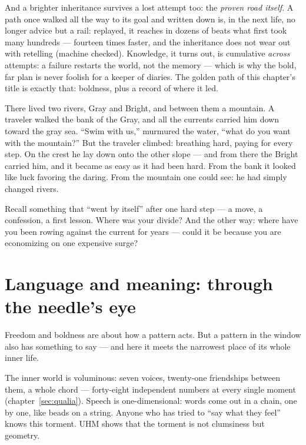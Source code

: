 \documentclass[11pt,letterpaper]{article}
\begin{document}
And a brighter inheritance survives a lost attempt too: the
\emph{proven road itself}. A path once walked all the way to its
goal and written down is, in the next life, no longer advice but a
rail: replayed, it reaches in dozens of beats what first took many
hundreds --- fourteen times faster, and the inheritance does not
wear out with retelling (machine checked). Knowledge, it turns out,
is cumulative \emph{across} attempts: a failure restarts the world,
not the memory --- which is why the bold, far plan is never foolish
for a keeper of diaries. The golden path of this chapter's title is
exactly that: boldness, plus a record of where it led.

\begin{talebox}
There lived two rivers, Gray and Bright, and between them a
mountain. A traveler walked the bank of the Gray, and all the
currents carried him down toward the gray sea. ``Swim with us,''
murmured the water, ``what do you want with the mountain?'' But the
traveler climbed: breathing hard, paying for every step. On the
crest he lay down onto the other slope --- and from there the Bright
carried him, and it became as easy as it had been hard. From the
bank it looked like luck favoring the daring. From the mountain one
could see: he had simply changed rivers.
\end{talebox}

\begin{askbox}
Recall something that ``went by itself'' after one hard step --- a
move, a confession, a first lesson. Where was your divide? And the
other way: where have you been rowing against the current for years
--- could it be because you are economizing on one expensive surge?
\end{askbox}

\section{Language and meaning: through the needle's eye}
\label{sec:language}

Freedom and boldness are about how a pattern acts. But a pattern in
the window also has something to say --- and here it meets the
narrowest place of its whole inner life.

The inner world is voluminous: seven voices, twenty-one friendships
between them, a whole chord --- forty-eight independent numbers at
every single moment (chapter~\ref{sec:qualia}). Speech is
one-dimensional: words come
out in a chain, one by one, like beads on a string. Anyone who has
tried to ``say what they feel'' knows this torment. UHM shows that
the torment is not clumsiness but geometry.
\end{document}
